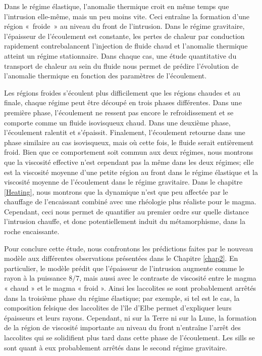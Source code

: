 Dans le régime élastique, l’anomalie thermique croit en même temps que
l’intrusion elle-même, mais un peu moins vite. Ceci entraîne la
formation d’une région « froide » au niveau du front de
l’intrusion. Dans le régime gravitaire, l’épaisseur de l’écoulement
est constante, les pertes de chaleur par conduction rapidement
contrebalancent l’injection de fluide chaud et l’anomalie thermique
atteint un régime stationnaire. Dans chaque cas, une étude
quantitative du transport de chaleur au sein du fluide nous permet de
prédire l’évolution de l’anomalie thermique en fonction des paramètres
de l’écoulement.

Les régions froides s’écoulent plus difficilement que les régions
chaudes et au finale, chaque régime peut être découpé en trois phases
différentes. Dans une première phase, l’écoulement ne ressent pas
encore le refroidissement et se comporte comme un fluide isovisqueux
chaud. Dans une deuxième phase, l’écoulement ralentit et
s’épaissit. Finalement, l’écoulement retourne dans une phase similaire
au cas isovisqueux, mais où cette fois, le fluide serait entièrement
froid. Bien que ce comportement soit commun aux deux régimes, nous
montrons que la viscosité effective n’est cependant pas la même dans
les deux régimes; elle est la viscosité moyenne d’une petite région au
front dans le régime élastique et la viscosité moyenne de l’écoulement
dans le régime gravitaire. Dans le chapitre \ref{Heating}, nous
montrons que la dynamique n’est que peu affectée par le chauffage de
l’encaissant combiné avec une rhéologie plus réaliste pour le
magma. Cependant, ceci nous permet de quantifier au premier ordre sur
quelle distance l'intrusion chauffe, et donc potentiellement induit du
métamorphisme, dans la roche encaissante.

Pour conclure cette étude, nous confrontons les prédictions faites par
le nouveau modèle aux différentes observations présentées dans le
Chapitre \ref{chap2}. En particulier, le modèle prédit que l’épaisseur
de l’intrusion augmente comme le rayon à la puissance $8/7$, mais
aussi avec le contraste de viscosité entre le magma « chaud » et le
magma « froid ». Ainsi les laccolites se sont probablement arrêtés
dans la troisième phase du régime élastique; par exemple, si tel est
le cas, la composition felsique des laccolites de l’île d’Elbe permet
d’expliquer leurs épaisseurs et leurs rayons. Cependant, ni sur la
Terre ni sur la Lune, la formation de la région de viscosité
importante au niveau du front n’entraîne l'arrêt
des laccolites qui se solidifient plus tard dans cette phase de
l'écoulement. Les sills se sont quant à eux probablement arrêtés dans
le second régime gravitaire.

